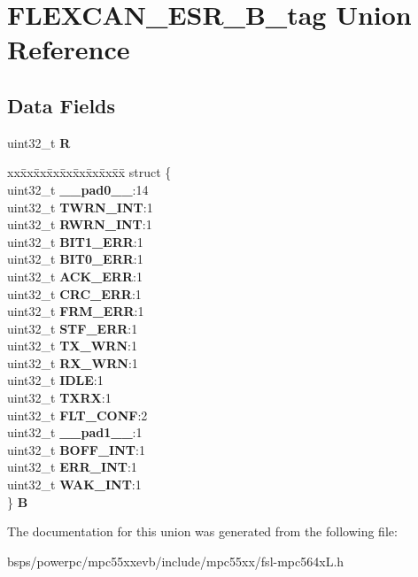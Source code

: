 \hypertarget{unionFLEXCAN__ESR__32B__tag}{}\section{F\+L\+E\+X\+C\+A\+N\+\_\+\+E\+S\+R\+\_\+B\+\_\+tag Union Reference}
\label{unionFLEXCAN__ESR__32B__tag}
\subsection*{Data Fields}
\begin{DoxyCompactItemize}
\item 
\mbox{\label{unionFLEXCAN__ESR__32B__tag_a44b9aa5e099b20b45208499caf17a963}} 
uint32\+\_\+t {\bfseries R}
\item 
\mbox{\label{unionFLEXCAN__ESR__32B__tag_ad27c030e36d6ed4b1ff4fd74712269ba}} 
\begin{tabbing}
xx\=xx\=xx\=xx\=xx\=xx\=xx\=xx\=xx\=\kill
struct \{\\
\>uint32\_t {\bfseries \_\_pad0\_\_}:14\\
\>uint32\_t {\bfseries TWRN\_INT}:1\\
\>uint32\_t {\bfseries RWRN\_INT}:1\\
\>uint32\_t {\bfseries BIT1\_ERR}:1\\
\>uint32\_t {\bfseries BIT0\_ERR}:1\\
\>uint32\_t {\bfseries ACK\_ERR}:1\\
\>uint32\_t {\bfseries CRC\_ERR}:1\\
\>uint32\_t {\bfseries FRM\_ERR}:1\\
\>uint32\_t {\bfseries STF\_ERR}:1\\
\>uint32\_t {\bfseries TX\_WRN}:1\\
\>uint32\_t {\bfseries RX\_WRN}:1\\
\>uint32\_t {\bfseries IDLE}:1\\
\>uint32\_t {\bfseries TXRX}:1\\
\>uint32\_t {\bfseries FLT\_CONF}:2\\
\>uint32\_t {\bfseries \_\_pad1\_\_}:1\\
\>uint32\_t {\bfseries BOFF\_INT}:1\\
\>uint32\_t {\bfseries ERR\_INT}:1\\
\>uint32\_t {\bfseries WAK\_INT}:1\\
\} {\bfseries B}\\

\end{tabbing}\end{DoxyCompactItemize}


The documentation for this union was generated from the following file\+:\begin{DoxyCompactItemize}
\item 
bsps/powerpc/mpc55xxevb/include/mpc55xx/fsl-\/mpc564x\+L.\+h\end{DoxyCompactItemize}
